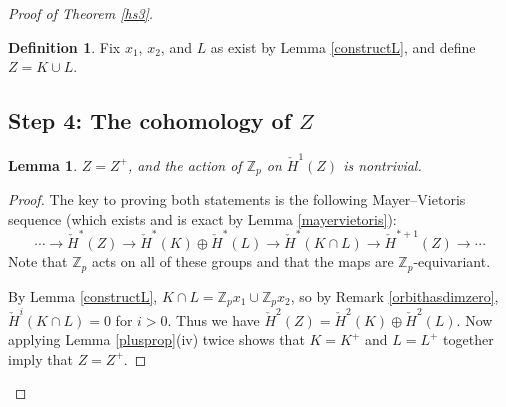 \documentclass[12pt]{article}
\theoremstyle{plain}
\newtheorem{lemma}[theorem]{Lemma}
\theoremstyle{definition}
\newtheorem{definition}[theorem]{Definition}
\theoremstyle{remark}
\numberwithin{equation}{section}
\begin{document}
\begin{proof}[Proof of Theorem \ref{hs3}]
\begin{definition}
Fix $x_1$, $x_2$, and $L$ as exist by Lemma \ref{constructL}, and define $Z=K\cup L$.
\end{definition}

\subsection{Step 4: The cohomology of $Z$}\label{cohomologyZsec}

\begin{lemma}\label{KLcohomology}
$Z=Z^+$, and the action of $\mathbb Z_p$ on $\check H^1(Z)$ is nontrivial.
\end{lemma}

\begin{proof}
The key to proving both statements is the following Mayer--Vietoris sequence (which exists and is exact by Lemma \ref{mayervietoris}):
\begin{equation}
\cdots\to\check H^\ast(Z)\to\check H^\ast(K)\oplus\check H^\ast(L)\to\check H^\ast(K\cap L)\to\check H^{\ast+1}(Z)\to\cdots
\end{equation}
Note that $\mathbb Z_p$ acts on all of these groups and that the maps are $\mathbb Z_p$-equivariant.

By Lemma \ref{constructL}, $K\cap L=\mathbb Z_px_1\cup\mathbb Z_px_2$, so by Remark \ref{orbithasdimzero}, $\check H^i(K\cap L)=0$ for $i>0$.  Thus we have $\check H^2(Z)=\check H^2(K)\oplus\check H^2(L)$.  Now applying Lemma \ref{plusprop}(iv) twice shows that $K=K^+$ and $L=L^+$ together imply that $Z=Z^+$.


\end{proof}
\end{proof}
\end{document}
